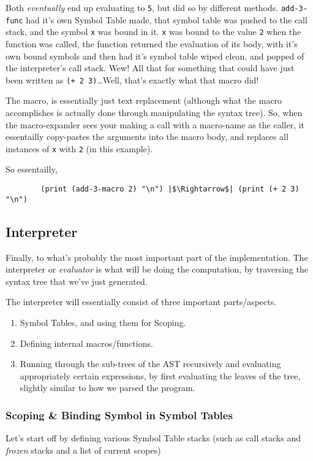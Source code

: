 \documentclass{article}
\newcommand{\code}[1]{\texttt{#1}}
\begin{document}
      Both \emph{eventually} end up evaluating to \code{5}, but did so by different
      methods. \code{add-3-func} had it's own Symbol Table made, that symbol table
      was pushed to the call stack, and the symbol \code{x} was bound in it.
      \code{x} was bound to the value \code{2} when the function was called, the
      function returned the evaluation of its body, with it's own bound symbols
      and then had it's symbol table wiped clean, and popped of the interpreter's
      call stack. Wew! All that for something that could have just been written
      as \code{(+ 2 3)}\ldots Well, that's exactly what that macro did!

      The macro, is essentially just text replacement (although what the macro
      accomplishes is actually done through manipulating the syntax tree).
      So, when the macro-expander sees your making a call with a macro-name as the
      caller, it essentailly copy-pastes the arguments into the macro body, and
      replaces all instances of \code{x} with \code{2} (in this example).

      So essentailly,
      \begin{verbatim}
        (print (add-3-macro 2) "\n") |$\Rightarrow$| (print (+ 2 3) "\n")
      \end{verbatim}

  \subsection{Interpreter}
    Finally, to what's probably the most important part of the implementation.
    The interpreter or \emph{evaluator} is what will be doing the computation,
    by traversing the syntax tree that we've just generated.

    The interpreter will essentially consist of three important parts/aspects.
    \begin{enumerate}
      \item Symbol Tables, and using them for Scoping.
      \item Defining internal macros/functions.
      \item Running through the sub-trees of the AST recursively and evaluating
      appropriately certain expressions, by first evaluating the leaves of the
      tree, slightly similar to how we parsed the program.
    \end{enumerate}

    \clearpage

    \subsubsection{Scoping \& Binding Symbol in Symbol Tables}
    Let's start off by defining various Symbol Table stacks (such as call stacks
    and \emph{frozen} stacks and a list of current scopes)
\end{document}
